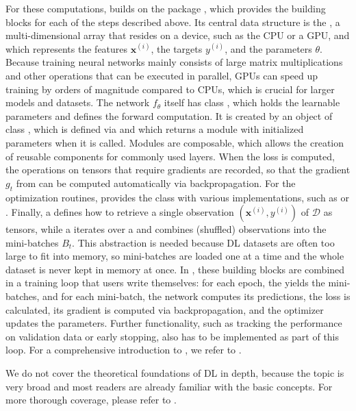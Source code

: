 \documentclass[article,shortnames]{jss}
\theoremstyle{definition}
\begin{document}
For these computations,  builds on the \rlang{} package  \citep{ref-torch2025}, which provides the building blocks for each of the steps described above.
Its central data structure is the , a multi-dimensional array that resides on a device, such as the CPU or a GPU, and which represents the features $\mathbf{x}^{(i)}$, the targets $y^{(i)}$, and the parameters $\theta$.
Because training neural networks mainly consists of large matrix multiplications and other operations that can be executed in parallel, GPUs can speed up training by orders of magnitude compared to CPUs, which is crucial for larger models and datasets.
The network $f_\theta$ itself has class , which holds the learnable parameters and defines the forward computation.
It is created by an object of class , which is defined via  and which returns a module with initialized parameters when it is called.
Modules are composable, which allows the creation of reusable components for commonly used layers.
When the loss is computed, the operations on tensors that require gradients are recorded, so that the gradient $g_t$ from  can be computed automatically via backpropagation.
For the optimization routines,  provides the  class with various implementations, such as  or .
Finally, a  defines how to retrieve a single observation $(\mathbf{x}^{(i)}, y^{(i)})$ of $\mathcal{D}$ as tensors, while a  iterates over a  and combines (shuffled) observations into the mini-batches $B_t$.
This abstraction is needed because DL datasets are often too large to fit into memory, so mini-batches are loaded one at a time and the whole dataset is never kept in memory at once.
In , these building blocks are combined in a training loop that users write themselves:
for each epoch, the  yields the mini-batches, and for each mini-batch, the network computes its predictions, the loss is calculated, its gradient is computed via backpropagation, and the optimizer updates the parameters.
Further functionality, such as tracking the performance on validation data or early stopping, also has to be implemented as part of this loop.
For a comprehensive introduction to , we refer to \citet{ref-keydana2023}.

We do not cover the theoretical foundations of DL in depth, because the topic is very broad and most readers are already familiar with the basic concepts. For more thorough coverage, please refer to \citet{bishop2024deep}.
\end{document}
